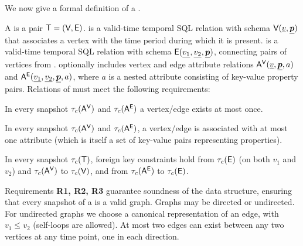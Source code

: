 We now give a formal definition of a \tg.

\begin{definition}[TGraph]
A \tg is a pair $\mathsf{T}=(\textsf{V}, \textsf{E})$. \tv is a valid-time temporal SQL
relation with schema $\textsf{V}(\underline{v}, \underline{\boldsymbol{p}})$ that
associates a vertex with the time period during which it is
present. \te is a valid-time temporal SQL relation with schema
$\textsf{E}(\underline{v_1}, \underline{v_2}, \underline{\boldsymbol{p}})$, connecting
pairs of vertices from \tv.  
%
\tve optionally includes vertex and edge attribute relations
$\mathsf{A^{V}}(\underline{v}, \underline{\boldsymbol{p}}, a)$ and $\mathsf{A^{E}}(\underline{v_1},
\underline{v_2}, \underline{\boldsymbol{p}}, a)$, where $a$ is a nested attribute
consisting of key-value property pairs.
%
Relations of \tve must meet the following requirements:

\begin{description}[noitemsep]
\item [R1: Unique vertices/edges] In every snapshot $\tau_c (\mathsf{A^{V}})$
  and $\tau_c (\mathsf{A^{E}})$ a vertex/edge exists at most once.
\item [R2: Unique attribute values] In every snapshot $\tau_c
  (\mathsf{A^{V}})$ and $\tau_c (\mathsf{A^{E}})$, a vertex/edge is associated with at
  most one attribute (which is itself a set of key-value pairs
  representing properties).
\item [R3: Referential integrity] In every snapshot $\tau_c (\mathsf{T})$,
  foreign key constraints hold from $\tau_c (\textsf{E})$ (on both $v_1$
  and $v_2$) and $\tau_c (\mathsf{A^{V}})$ to $\tau_c (\textsf{V})$, and from
  $\tau_c (\mathsf{A^{E}})$ to $\tau_c (\textsf{E})$.
\end{description}
\label{def:tg}
\vspace{-0.2cm}
\end{definition}

Requirements {\bf R1, R2, R3} guarantee soundness of the \tg data
structure, ensuring that every snapshot of a \tg is a valid
graph. Graphs may be directed or undirected.  For undirected graphs we
choose a canonical representation of an edge, with $v_1 \leq v_2$
(self-loops are allowed). At most
two edges can exist between any two vertices at any time point, one in
each direction.

